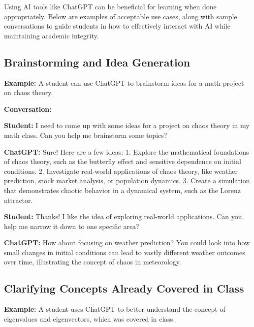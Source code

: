 \documentclass{article}
\begin{document}
Using AI tools like ChatGPT can be beneficial for learning when done appropriately. Below are examples of acceptable use cases, along with sample conversations to guide students in how to effectively interact with AI while maintaining academic integrity.

\subsection{Brainstorming and Idea Generation}

\textbf{Example:} A student can use ChatGPT to brainstorm ideas for a math project on chaos theory.

\textbf{Conversation:}
\begin{mdframed}
\begin{flushleft}
\textbf{Student:} I need to come up with some ideas for a project on chaos theory in my math class. Can you help me brainstorm some topics?

\textbf{ChatGPT:} Sure! Here are a few ideas:
1. Explore the mathematical foundations of chaos theory, such as the butterfly effect and sensitive dependence on initial conditions.
2. Investigate real-world applications of chaos theory, like weather prediction, stock market analysis, or population dynamics.
3. Create a simulation that demonstrates chaotic behavior in a dynamical system, such as the Lorenz attractor.

\textbf{Student:} Thanks! I like the idea of exploring real-world applications. Can you help me narrow it down to one specific area?

\textbf{ChatGPT:} How about focusing on weather prediction? You could look into how small changes in initial conditions can lead to vastly different weather outcomes over time, illustrating the concept of chaos in meteorology.
\end{flushleft}
\end{mdframed}

\subsection{Clarifying Concepts Already Covered in Class}

\textbf{Example:} A student uses ChatGPT to better understand the concept of eigenvalues and eigenvectors, which was covered in class.
\end{document}
